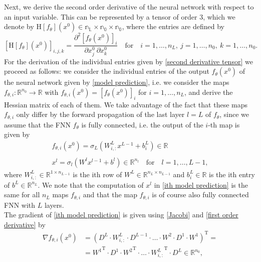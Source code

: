 Next, we derive the second order derivative of the neural network with respect to an input variable. This can be represented by a tensor of order 3, which we denote by $\mathrm{H} \left[f_{\theta} \right]\left(x^0\right) \in \mathbb{n_L \times n_0 \times n_0}$, where the entries are defined by
\begin{equation}
    \label{second derivative tensor}
    \left[ \mathrm{H} \left[f_{\theta} \right]\left(x^0\right) \right]_{i,j,k} = \frac{\partial^2 \left[f_{\theta}\left(x^0\right)\right]_i}{\partial x^0_{j} \ \partial x^0_{k}} \quad \text{for} \quad i = 1,\ldots, n_L, \ j = 1,\ldots, n_0, \ k = 1,\ldots, n_0.
\end{equation}
For the derivation of the individual entries given by \cref{second derivative tensor} we proceed as follows: we consider the individual entries of the output $f_{\theta}\left(x^0\right)$ of the neural network given by \cref{model prediction}, i.e. we consider the maps $f_{\theta, i} \colon \mathbb{R}^{n_0} \to \mathbb{R}$ with $f_{\theta, i} \left( x^0 \right) = \left[ f_{\theta} (x^0) \right]_i$ for $i = 1, \ldots, n_L$, and derive the Hessian matrix of each of them. We take advantage of the fact that these maps $f_{\theta, i}$ only differ by the forward propagation of the last layer $l = L$ of $f_{\theta}$, since we assume that the FNN $f_{\theta}$ is fully connected, i.e. the output of the $i$-th map is given by 
\begin{gather}
    \label{ith model prediction}
    f_{\theta, i} (x^0) = \sigma_L\left(W^L_{i,:} x^{L-1}  + b^{L}_{i} \right) \in \mathbb{R} \\
    \\
    x^l = \sigma_l\left(W^l x^{l-1} + b^l\right) \in \mathbb{R}^{n_l} \quad \text{for} \quad l = 1, \ldots, L-1,
\end{gather}
where $W^L_{i,:} \in \mathbb{R}^{1 \times n_{L-1}}$ is the ith row of $W^L \in \mathbb{R}^{n_L \times n_{L-1}}$ and $b^{L}_{i} \in \mathbb{R}$ is the ith entry of $b^{L} \in \mathbb{R}^{n_L}$. We note that the computation of $x^l$ in \cref{ith model prediction} is the same for all $n_L$ maps $f_{\theta, i}$ and that the map $f_{\theta, i}$ is of course also fully connected FNN with $L$ layers. \\
The gradient of \cref{ith model prediction} is given using \cref{Jacobi} and \cref{first order derivative} by
\begin{align}
    \label{ith first order derivative}
    \nabla f_{\theta, i} \left(x^0\right) & = \left( D^L \cdot W^L_{i,:} \cdot D^{L-1} \cdot \ldots \cdot W^2 \cdot D^1 \cdot W^{1} \right)^{\mathrm{T}} = \\
    & = {W^{1}}^{\mathrm{T}} \cdot D^{1} \cdot {W^{2}}^{\mathrm{T}} \cdot \ldots \cdot {W^L_{i,:}}^{\mathrm{T}}  \cdot  D^{L} \in \mathbb{R}^{n_0}, 
\end{align}
